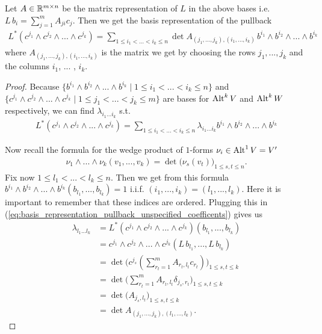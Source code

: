 \documentclass[../main.tex]{subfiles}
\begin{document}
\begin{proposition}
    Let $A \in \mathbb{R}^{m\times n}$ be the matrix representation of $L$ in the 
    above bases i.e.
    $L\,b_i = \sum_{j=1}^m A_{ji} c_j$. Then we get the basis representation 
    of the pullback 
    \begin{align}
        L^* (c^{j_1} \wedge c^{j_2} \wedge ... \wedge c^{j_k})
        = \sum\limits_{1 \leq i_1 < ... < i_k \leq n} 
            \det A_{(j_1,...,j_k),(i_1,...,i_k)} \,
            b^{i_1} \wedge b^{i_2} \wedge ... \wedge b^{i_k}
        \label{eq:basis_representation_pullback}
    \end{align}
    where $A_{(j_1,...,j_k),(i_1,...,i_k)}$ is the matrix we get 
    by choosing the rows $j_1,...,j_k$  and the columns $i_1$, ... , $i_k$. 
\end{proposition}
\begin{proof}
    Because $\{ b^{i_1}\wedge b^{i_2}\wedge ... \wedge b^{i_k} 
    \mid 1 \leq i_1 < ... < i_k  \leq n \}$ and 
    $\{ c^{j_1}\wedge c^{j_2}\wedge ... \wedge c^{j_k} 
    \mid 1 \leq j_1 < ... < j_k  \leq m \}$ are bases for ${\text{Alt}^{k}\,V}$ 
    and ${\text{Alt}^{k}\,W}$ respectively, we can find $\lambda_{i_1 ... i_k}$ s.t.
    \begin{align}
        L^* (c^{j_1} \wedge c^{j_2} \wedge ... \wedge c^{j_k})
        = \sum\limits_{1 \leq i_1 < ... < i_k \leq n} 
        \lambda_{i_1 ... i_k} b^{i_1} \wedge b^{i_2} \wedge ... \wedge b^{i_k}
        \label{eq:basis_representation_pullback_unspecified_coefficents}
    \end{align}

    Now recall the formula for the wedge product of $1$-forms 
    $\nu_i \in {\text{Alt}^{1}\,V} = V'$
    \begin{align*}
        \nu_1 \wedge ... \wedge \nu_k (v_1,...,v_k) = 
        \det \big( \nu_s(v_t) \big)_{1 \leq s,t \leq n}.
    \end{align*}
    Fix now $1 \leq l_1 < ... <  l_k \leq n$. Then we get from this formula
    $b^{i_1} \wedge b^{i_2} \wedge ... \wedge b^{i_k} ( b_{l_1},...,b_{l_k}) = 1$ 
    i.i.f. $(i_1,...,i_k) = (l_1,...,l_k)$. Here it is important to remember that 
    these indices are ordered. Plugging this in 
    (\ref{eq:basis_representation_pullback_unspecified_coefficents}) gives us 
    \begin{align*}
        \lambda_{l_1 ... l_k}  &= 
            L^* (c^{j_1} \wedge c^{j_2} \wedge ... \wedge c^{j_k})
            (b_{l_1},...,b_{l_k})
        \\ &= c^{j_1} \wedge c^{j_2} \wedge ... \wedge c^{j_k} 
            (L\,b_{l_1},...,L\,b_{l_k})
        \\ &= \det \big( c^{j_s}(\sum_{r_t = 1}^m A_{r_t,l_t}c_{r_t}) 
            \big)_{1 \leq s,t \leq k}
        \\ &= \det \big( \sum_{r_t = 1}^m A_{r_t,l_t} \delta_{j_s,r_t}
            \big)_{1 \leq s,t \leq k}
        \\ &= \det \big( A_{j_s,l_t} \big)_{1 \leq s,t \leq k}
        \\ &= \det A_{(j_1,...,j_k),(l_1,...,l_k)}.
    \end{align*}
\end{proof}
\end{document}
